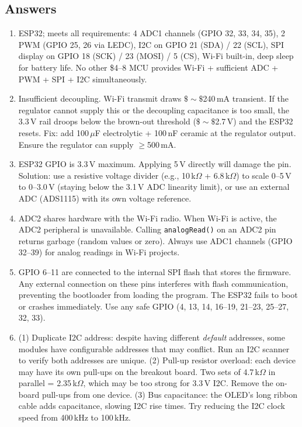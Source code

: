 \documentclass[11pt,letterpaper,twoside,openany]{book}
\begin{document}
\subsection{Answers}
\begin{enumerate}[leftmargin=1.5em]
\item ESP32; meets all requirements: 4 ADC1 channels (GPIO 32, 33, 34, 35), 2 PWM (GPIO 25, 26 via LEDC), I2C on GPIO 21 (SDA) / 22 (SCL), SPI display on GPIO 18 (SCK) / 23 (MOSI) / 5 (CS), Wi-Fi built-in, deep sleep for battery life. No other \$4--8 MCU provides Wi-Fi + sufficient ADC + PWM + SPI + I2C simultaneously.
\item Insufficient decoupling. Wi-Fi transmit draws $\$\sim\$$240\,mA transient. If the regulator cannot supply this or the decoupling capacitance is too small, the 3.3\,V rail droops below the brown-out threshold ($\$\sim\$$2.7\,V) and the ESP32 resets. Fix: add 100\,$\mu$F electrolytic + 100\,nF ceramic at the regulator output. Ensure the regulator can supply $\geq$500\,mA.
\item ESP32 GPIO is 3.3\,V maximum. Applying 5\,V directly will damage the pin. Solution: use a resistive voltage divider (e.g., 10\,k$\Omega$ + 6.8\,k$\Omega$) to scale 0--5\,V to 0--3.0\,V (staying below the 3.1\,V ADC linearity limit), or use an external ADC (ADS1115) with its own voltage reference.
\item ADC2 shares hardware with the Wi-Fi radio. When Wi-Fi is active, the ADC2 peripheral is unavailable. Calling \texttt{analogRead()} on an ADC2 pin returns garbage (random values or zero). Always use ADC1 channels (GPIO 32--39) for analog readings in Wi-Fi projects.
\item GPIO 6--11 are connected to the internal SPI flash that stores the firmware. Any external connection on these pins interferes with flash communication, preventing the bootloader from loading the program. The ESP32 fails to boot or crashes immediately. Use any safe GPIO (4, 13, 14, 16--19, 21--23, 25--27, 32, 33).
\item (1) Duplicate I2C address: despite having different \emph{default} addresses, some modules have configurable addresses that may conflict. Run an I2C scanner to verify both addresses are unique. (2) Pull-up resistor overload: each device may have its own pull-ups on the breakout board. Two sets of 4.7\,k$\Omega$ in parallel = 2.35\,k$\Omega$, which may be too strong for 3.3\,V I2C. Remove the on-board pull-ups from one device. (3) Bus capacitance: the OLED's long ribbon cable adds capacitance, slowing I2C rise times. Try reducing the I2C clock speed from 400\,kHz to 100\,kHz.

\end{enumerate}
\end{document}
